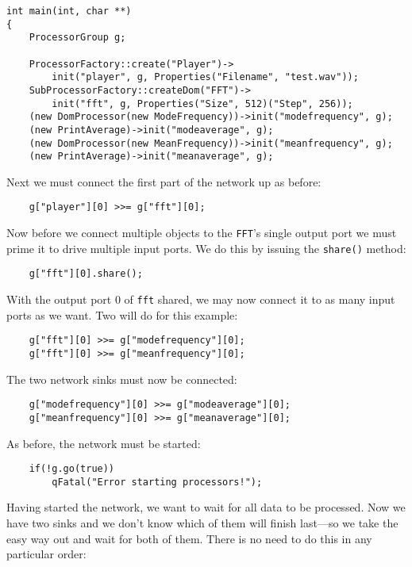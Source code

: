 \begin{verbatim}
int main(int, char **)
{
    ProcessorGroup g;

    ProcessorFactory::create("Player")->
        init("player", g, Properties("Filename", "test.wav"));
    SubProcessorFactory::createDom("FFT")->
        init("fft", g, Properties("Size", 512)("Step", 256));
    (new DomProcessor(new ModeFrequency))->init("modefrequency", g);
    (new PrintAverage)->init("modeaverage", g);
    (new DomProcessor(new MeanFrequency))->init("meanfrequency", g);
    (new PrintAverage)->init("meanaverage", g);
\end{verbatim}

Next we must connect the first part of the network up as before:

\begin{verbatim}
    g["player"][0] >>= g["fft"][0];
\end{verbatim}

Now before we connect multiple objects to the \texttt{FFT}'s single output port we must prime it to drive multiple input ports. We do this by issuing the \texttt{share()} method:

\begin{verbatim}
    g["fft"][0].share();
\end{verbatim}

With the output port 0 of \texttt{fft} shared, we may now connect it to as many input ports as we want. Two will do for this example:

\begin{verbatim}
    g["fft"][0] >>= g["modefrequency"][0];
    g["fft"][0] >>= g["meanfrequency"][0];
\end{verbatim}

The two network sinks must now be connected:

\begin{verbatim}
    g["modefrequency"][0] >>= g["modeaverage"][0];
    g["meanfrequency"][0] >>= g["meanaverage"][0];
\end{verbatim}

As before, the network must be started:

\begin{verbatim}
    if(!g.go(true))
        qFatal("Error starting processors!");
\end{verbatim}

Having started the network, we want to wait for all data to be processed. Now we have two sinks and we don't know which of them will finish last---so we take the easy way out and wait for both of them. There is no need to do this in any particular order:

